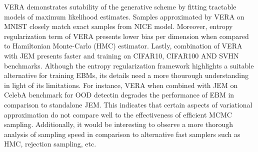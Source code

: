 \documentclass[11pt,letterpaper]{article}
\begin{document}
VERA demonstrates sutability of the generative scheme by fitting tractable models of maximum likelihood estimates. Samples approximated by VERA on MNIST closely match exact samples from NICE model. Moreover, entropy regularization term of VERA presents lower bias per dimension when compared to Hamiltonian Monte-Carlo (HMC) estimator. Lastly, combination of VERA with JEM presents faster and training on CIFAR10, CIFAR100 AND SVHN benchmarks. Although the entropy regularization framework highlights a suitable alternative for training EBMs, its details need a more thourough understanding in light of its limitations. For instance, VERA when combined with JEM on CelebA benchmark for OOD detectin degrades the performance of EBM in comparison to standalone JEM. This indicates that certain aspects of variational approximation do not compare well to the effectiveness of efficient MCMC sampling. Additionally, it would be interesting to observe a more thorough analysis of sampling speed in comparison to alternative fast samplers such as HMC, rejection sampling, etc. 
\end{document}
